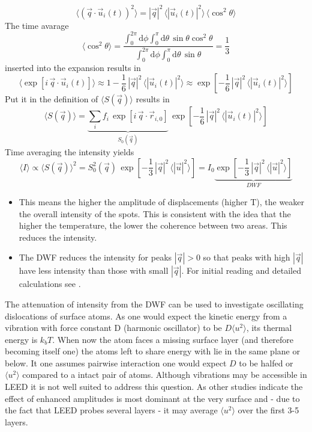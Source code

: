 $$\langle \left(\vec{q}\cdot\vec{u}_{i}(t)\right)^2 \rangle=|\vec{q}|^{2}\,\langle|\vec{u}_{i}(t)|^2\rangle \,\langle\cos^{2}\theta\rangle$$ The time avarage 
$$ \langle \cos^{2}\theta \rangle=\frac{\int_{0}^{2\pi}\mathrm{d}\phi\int_{0}^{\pi}\mathrm{d}\theta\,\sin\theta\cos^{2}\theta}{\int_{0}^{2\pi}\mathrm{d}\phi\int_{0}^{\pi}\mathrm{d}\theta\,\sin\theta}=\frac{1}{3} $$ inserted into the expansion results in
$$\langle \exp\left[i\,\vec{q}\cdot\vec{u}_{i}(t)\right]\rangle \approx1-\frac{1}{6}\,|\vec{q}|^{2}\,\langle|\vec{u}_{i}(t)|^2\rangle \approx \exp\left[-\frac{1}{6}\,|\vec{q}|^{2}\,\langle|\vec{u}_{i}(t)|^2\rangle \right]$$
Put it in the definition of $\langle S(\vec q) \rangle$ results in
$$\langle S(\vec q) \rangle =\underbrace{\sum_i f_{i}\,\exp\left[i\,\vec{q}\cdot\vec{r}_{i,0}\right]}_{S_0(\vec q)}\,\exp\left[-\frac{1}{6}\,|\vec{q}|^{2}\,\langle|\vec{u}_{i}(t)|^2 \rangle \right]$$
Time averaging the intensity yields $$\langle I \rangle \propto \langle S(\vec q)\rangle^2 =S_0^2(\vec q)\,\exp\left[-\frac{1}{3}\,|\vec{q}|^{2}\,\langle|\vec{u}|^2\rangle \right]=I_{0}\underbrace{\exp\left[-\frac{1}{3}\,|\vec{q}|^{2}\,\langle|\vec{u}|^2\rangle \right]}_{DWF}$$
\begin{itemize}
 \item This means the higher the amplitude of displacements (higher T), the weaker the overall intensity of the spots. This is consistent with the idea that the higher the temperature, the lower the coherence between two areas. This reduces the intensity.
 \item The DWF reduces the intensity for peaks $|\vec q|>0$ so that peaks with high $|\vec q|$ have less intensity than those with small $|\vec q|$. For initial reading and detailed calculations see \cite{debye_interferenz_1913}.
\end{itemize}
The attenuation of intensity from the DWF can be used to investigate oscillating dislocations of surface atoms. As one would expect the kinetic energy from a vibration with force constant D (harmonic oscillator) to be $D\langle u^2\rangle$, its thermal energy is $k_bT$. When now the atom faces a missing surface layer (and therefore becoming itself one) the atoms left to share energy with lie in the same plane or below. It one assumes pairwise interaction one would expect $D$ to be halfed or $\langle u^2 \rangle$ compared to a intact pair of atoms\cite[69]{woodruff_modern_1986}. Although vibrations may be accessible in LEED it is not well suited to address this question. As other studies indicate the effect of enhanced amplitudes is most dominant at the very surface and - due to the fact that LEED probes several layers - it may average $\langle u^2 \rangle$ over the first 3-5 layers.

